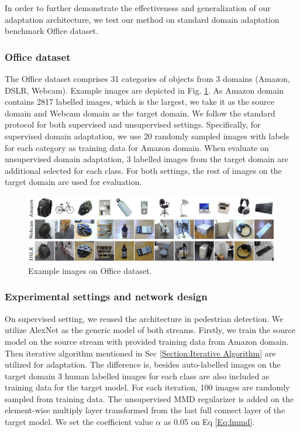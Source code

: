 \documentclass[runningheads]{llncs}
\begin{document}
In order to further demonstrate the effectiveness and generalization of our adaptation architecture, we test our method on standard domain adaptation benchmark Office dataset\cite{saenko2010adapting}.

\subsubsection{Office dataset}
The Office dataset comprises 31 categories of objects from 3 domains (Amazon, DSLR, Webcam). Example images are depicted in Fig. \ref{fig:officeimages}. As Amazon domain contains 2817 labelled images, which is the largest, we take it as the source domain and Webcam domain as the target domain. We follow the standard protocol for both supervised and unsupervised settings. Specifically, for supervised domain adaptation, we use 20 randomly sampled images with labels for each category as training data for Amazon domain. When evaluate on unsupervised domain adaptation, 3 labelled images from the target domain are additional selected for each class. For both settings, the rest of images on the target domain are used for evaluation.

\begin{figure}
\centering
\includegraphics[height=3cm]{images/officeimages.png}
\caption{Example images on Office dataset.}
\label{fig:officeimages}
\end{figure}

\subsubsection{Experimental settings and network design}
On supervised setting, we reused the architecture in pedestrian detection. We utilize AlexNet \cite{krizhevsky2012imagenet} as the generic model of both streams. Firstly, we train the source model on the source stream with provided training data from Amazon domain. Then iterative algorithm mentioned in Sec \ref{Section:Iterative Algorithm} are utilized for adaptation. The difference is, besides auto-labelled images on the target domain 3 human labelled images for each class are also included as training data for the target model. For each iteration, 100 images are randomly sampled from training data. The unsupervised MMD regularizer is added on the element-wise multiply layer transformed from the last full connect layer of the target model. We set the coefficient value $\alpha$ as 0.05 on Eq \ref{Eq:lmmd}.
\end{document}

